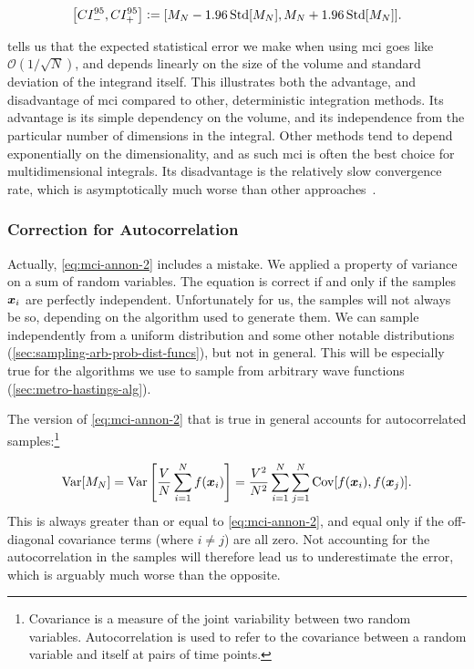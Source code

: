\documentclass[Thesis.tex]{subfiles}
\begin{document}
\begin{align}
  \qty[CI_{-}^{95}, CI_{+}^{95}] \vcentcolon= \qty[M_N - 1.96\operatorname{Std}[M_N], M_N + 1.96\operatorname{Std}[M_N]].
\end{align}

 tells us that the expected statistical error we make when using \gls{mci} goes
like $\mathcal{O}(1 / \sqrt N)$, and depends linearly on the size of the volume
and standard deviation of the integrand itself. This illustrates both the
advantage, and disadvantage of \gls{mci} compared to other,
deterministic integration methods. Its advantage is its simple dependency on the
volume, and its independence from the particular number of dimensions in the
integral. Other methods tend to depend exponentially on the dimensionality, and
as such \gls{mci} is often the best choice for multidimensional integrals. Its
disadvantage is the relatively slow convergence rate, which is asymptotically
much worse than other approaches~\cite{Numerical-Recipes-Press-et-al}.

\subsubsection{Correction for Autocorrelation}

Actually, \cref{eq:mci-annon-2} includes a mistake. We applied a property of
variance on a sum of random variables. The equation is correct if and
only if the samples $\bm{x}_i$ are perfectly independent. Unfortunately for us,
the samples will not always be so, depending on the algorithm used to generate
them. We can sample independently from a uniform distribution and some other
notable distributions (\cref{sec:sampling-arb-prob-dist-funcs}), but not in
general. This will be especially true for the algorithms we use to sample from
arbitrary wave functions (\cref{sec:metro-hastings-alg}).

The version of \cref{eq:mci-annon-2} that is true in general accounts for
autocorrelated samples:\footnote{Covariance is a measure of the joint
  variability between two random variables. Autocorrelation is used to refer to
  the covariance between a random variable and itself at pairs of time points.}


\begin{align}
  \label{eq:mci-annon-3}
    \operatorname{Var}[M_N] = \operatorname{Var}\qty[ \frac{V}{N} \sum_{i=1}^Nf(\bm{x}_i)] = \frac{V^2}{N^2}\sum_{i=1}^N\sum_{j=1}^N\operatorname{Cov}[f(\bm{x}_i), f(\bm{x}_j)].
\end{align}
This is always greater than or equal to \cref{eq:mci-annon-2}, and equal only if
the off-diagonal covariance terms (where $i\neq j$) are all zero. Not accounting
for the autocorrelation in the samples will therefore lead us to underestimate
the error, which is arguably much worse than the opposite.
\end{document}
